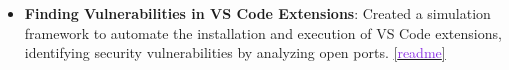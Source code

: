 \documentclass[10pt,a4paper,calibri]{moderncv}
\newcommand{\mediumspace}{\vspace{0.6em}}
\begin{document}
\begin{itemize}
	\item \textbf{Finding Vulnerabilities in VS Code Extensions}: Created a simulation framework to automate the installation and execution of VS Code extensions, identifying security vulnerabilities by analyzing open ports.
	      \href{https://github.com/prateekdceit06/VSCode-Extensions-Simulator}{[\textcolor{blueviolet}{readme}]}
\end{itemize}




\end{document}
